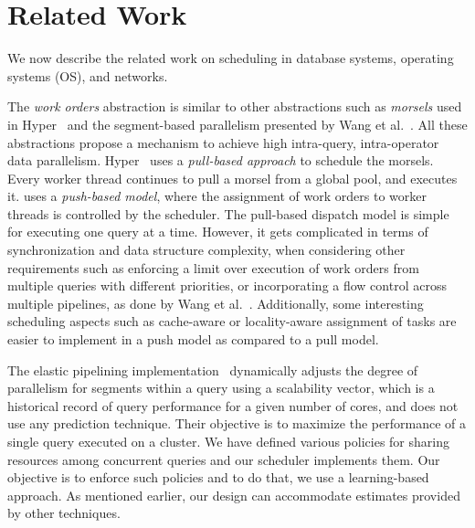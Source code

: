 \section{Related Work}\label{sec:related}
We now describe the related work on scheduling in database systems, operating systems (OS), and networks. %

The \textit{work orders} abstraction is similar to other abstractions such as \textit{morsels} used in Hyper~\cite{morsel} and the segment-based parallelism presented by Wang et al.~\cite{wang2016elastic}. 
All these abstractions propose a mechanism to achieve high intra-query, intra-operator data parallelism.
Hyper~\cite{morsel} uses a \textit{pull-based approach} to schedule the morsels. 
Every worker thread continues to pull a morsel from a global pool, and executes it.
\sys{} uses a \textit{push-based model}, where the assignment of work orders to worker threads is controlled by the scheduler.
The pull-based dispatch model is simple for executing one query at a time. 
However, it gets complicated in terms of synchronization and data structure complexity, when considering other requirements such as enforcing a limit over execution of work orders from multiple queries with different priorities, or incorporating a flow control across multiple pipelines, as done by Wang et al.~\cite{wang2016elastic}.
Additionally, some interesting scheduling aspects such as cache-aware or locality-aware assignment of tasks are easier to implement in a push model as compared to a pull model.

The elastic pipelining implementation~\cite{wang2016elastic} dynamically adjusts the degree of parallelism for segments within a query using a scalability vector, which is a historical record of query performance for a given number of cores, and does not use any prediction technique.
Their objective is to maximize the performance of a single query executed on a cluster.
We have defined various policies for sharing resources among concurrent queries and our scheduler implements them. 
Our objective is to enforce such policies and to do that, we use a learning-based approach.
As mentioned earlier, our design can accommodate estimates provided by other techniques.

